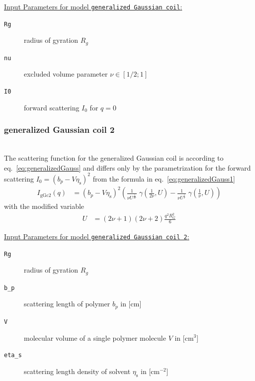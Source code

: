 \vspace{5mm}
\uline{Input Parameters for model \texttt{generalized Gaussian coil}:}
\begin{description}
\item[\texttt{Rg}] radius of gyration $R_g$
\item[\texttt{nu}] excluded volume parameter $\nu\in [1/2;1]$
\item[\texttt{I0}] forward scattering $I_0$ for $q=0$
\end{description}
\vspace{5mm}


\subsubsection{generalized Gaussian coil 2} \cite{Hammouda,Hammouda2012}
\label{sect:generalized_gaussian_coil2}
~\\
The scattering function for the generalized Gaussian coil is according to eq.\ \ref{eq:generalizedGauss}
and differs only by the parametrization for the forward scattering
$I_0=(b_p-V\eta_\text{s})^2$ from the formula in eq.\ \ref{eq:generalizedGauss1}
\begin{align}
I_\text{gGc2}(q) &= \left(b_p-V\eta_\text{s}\right)^2
\left(
\frac{1}{\nu U^{\frac{1}{2 \nu}}} \; \gamma\left(\frac{1}{2 \nu},U\right)-
\frac{1}{\nu U^{\frac{1}{  \nu}}} \; \gamma\left(\frac{1}{  \nu},U\right)
\right)
\label{eq:generalizedGauss2}
\end{align}
with the modified variable
\begin{align}
U&= \left(2\nu+1\right)\left(2\nu+2\right)\frac{q^2R_G^2}{6}
\end{align}

\vspace{5mm}
\uline{Input Parameters for model \texttt{generalized Gaussian coil 2}:}
\begin{description}
\item[\texttt{Rg}] radius of gyration $R_g$
\item[\texttt{b\_p}] scattering length of polymer $b_p$ in [cm]
\item[\texttt{V}] molecular volume of a single polymer molecule $V$ in [cm$^3$]
\item[\texttt{eta\_s}] scattering length density of solvent $\eta_\text{s}$ in [cm$^{-2}$]
\end{description}
\vspace{5mm}

